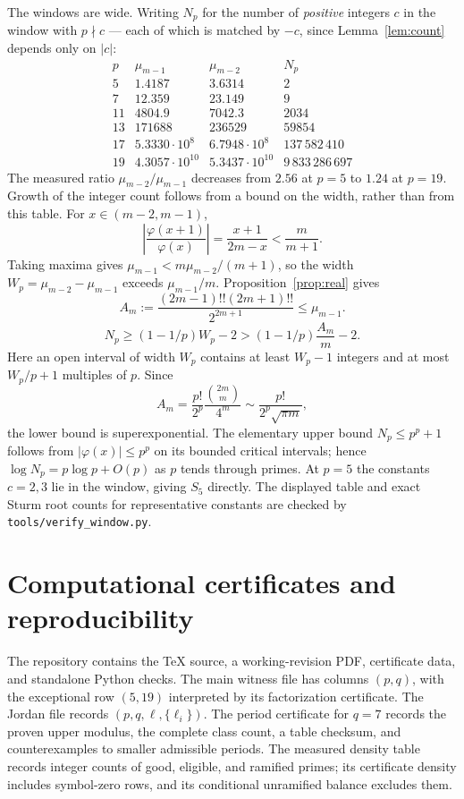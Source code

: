 \documentclass[11pt,a4paper]{amsart}
\theoremstyle{plain}
\theoremstyle{definition}
\begin{document}
The windows are wide. Writing \(N_p\) for the number of \emph{positive} integers \(c\) in the window with \(p\nmid c\) --- each of which is matched by \(-c\), since Lemma~\ref{lem:count} depends only on \(\lvert c\rvert\):
\[
\begin{array}{r|llr}
p & \mu_{m-1} & \mu_{m-2} & N_p\\\hline
5 & 1.4187 & 3.6314 & 2\\
7 & 12.359 & 23.149 & 9\\
11 & 4804.9 & 7042.3 & 2034\\
13 & 171688 & 236529 & 59854\\
17 & 5.3330\cdot10^{8} & 6.7948\cdot10^{8} & 137\,582\,410\\
19 & 4.3057\cdot10^{10} & 5.3437\cdot10^{10} & 9\,833\,286\,697
\end{array}
\]
The measured ratio \(\mu_{m-2}/\mu_{m-1}\) decreases from \(2.56\) at \(p=5\) to \(1.24\) at \(p=19\). Growth of the integer count follows from a bound on the width, rather than from this table. For \(x\in(m-2,m-1)\),
\[
 \left|\frac{\varphi(x+1)}{\varphi(x)}\right|
 =\frac{x+1}{2m-x}<\frac{m}{m+1}.
\]
Taking maxima gives \(\mu_{m-1}<m\mu_{m-2}/(m+1)\), so the width \(W_p=\mu_{m-2}-\mu_{m-1}\) exceeds \(\mu_{m-1}/m\). Proposition~\ref{prop:real} gives
\[
 A_m:=\frac{(2m-1)!!(2m+1)!!}{2^{2m+1}}
 \le\mu_{m-1}.
\]
\[
 N_p\ge(1-1/p)W_p-2>(1-1/p)\frac{A_m}{m}-2.
\]
Here an open interval of width \(W_p\) contains at least \(W_p-1\) integers and at most \(W_p/p+1\) multiples of \(p\). Since
\[
 A_m=\frac{p!}{2^p}\frac{\binom{2m}{m}}{4^m}
 \sim\frac{p!}{2^p\sqrt{\pi m}},
\]
the lower bound is superexponential. The elementary upper bound \(N_p\le p^p+1\) follows from \(|\varphi(x)|\le p^p\) on its bounded critical intervals; hence \(\log N_p=p\log p+O(p)\) as \(p\) tends through primes. At \(p=5\) the constants \(c=2,3\) lie in the window, giving \(S_5\) directly. The displayed table and exact Sturm root counts for representative constants are checked by \texttt{tools/verify\_window.py}.

\section{Computational certificates and reproducibility}
\label{sec:reproduce}

The repository contains the TeX source, a working-revision PDF, certificate data, and standalone Python checks. The main witness file has columns \((p,q)\), with the exceptional row \((5,19)\) interpreted by its factorization certificate. The Jordan file records \((p,q,\ell,\{\ell_i\})\). The period certificate for \(q=7\) records the proven upper modulus, the complete class count, a table checksum, and counterexamples to smaller admissible periods. The measured density table records integer counts of good, eligible, and ramified primes; its certificate density includes symbol-zero rows, and its conditional unramified balance excludes them.
\end{document}
